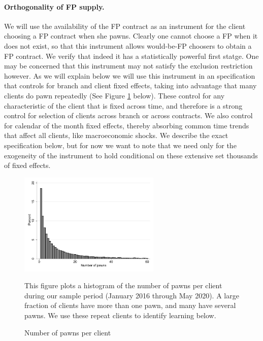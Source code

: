 \documentclass[oneside,11pt]{article}
\begin{document}
\paragraph{Orthogonality of FP supply.} We will use the availability of the FP contract as an instrument for the client choosing a FP contract when she pawns. Clearly one cannot choose a FP when it does not exist, so that this instrument allows would-be-FP choosers to obtain a FP contract. We verify that indeed it has a statistically powerful first statge. One may be concerned that this instrument may not satisfy the exclusion restriction however. As we will explain below we will use this instrument in an specification that controls for branch and client fixed effects, taking into advantage that many clients do pawn repeatedly (See Figure \ref{hist_num_pawns} below). These control for any characteristic of the client that is fixed across time, and therefore is a strong control for selection of clients across branch or across contracts. We also control for calendar of the month fixed effects, thereby absorbing common time trends that affect all clients, like macroeconomic shocks. We describe the exact specification below, but for now we want to note that we need only for the exogeneity of the instrument to hold conditional on these extensive set thousands of fixed effects. 

    \vspace{.1in}
\begin{figure}[H]
        \caption{Number of pawns per client}
    \label{hist_num_pawns}
    \begin{center}
        \centering
        \includegraphics[width=0.6\textwidth]{Figuras/hist_num_pawns.pdf}
    \end{center}
     \scriptsize This figure plots a histogram of the number of pawns per client during our sample period (January 2016 through May 2020). A large fraction of clients have more than one pawn, and many have several pawns. We use these repeat clients to identify learning below. 
\end{figure}
\vspace{.1in}
\end{document}
